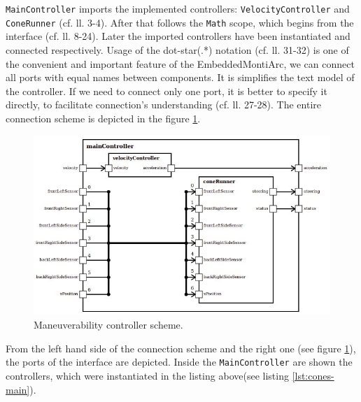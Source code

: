 \bigskip
\texttt{MainController} imports the implemented controllers: \texttt{VelocityController} and \texttt{ConeRunner} (cf. ll. 3-4). After that follows the \texttt{Math} scope, which begins from the interface (cf. ll. 8-24). Later the imported controllers have been instantiated and connected respectively. Usage of the dot-star(.*) notation (cf. ll. 31-32) is one of the convenient and important feature of the EmbeddedMontiArc, we can connect all ports with equal names between components. It is simplifies the text model of the controller. If we need to connect only one port, it is better to specify it directly, to facilitate connection's understanding (cf. ll. 27-28). The entire connection scheme is depicted in the figure \ref{fig:maneuverability-scheme}.
\begin{figure}[ht]
    \centering
    \includegraphics[width=0.8\linewidth]{src/pic/controller04}
    \caption{Maneuverability controller scheme.}
    \label{fig:maneuverability-scheme}
\end{figure} \newline
From the left hand side of the connection scheme and the right one (see figure \ref{fig:maneuverability-scheme}), the ports of the interface are depicted. Inside the \texttt{MainController} are shown the controllers, which were instantiated in the listing above(see listing \ref{lst:cones-main}).

